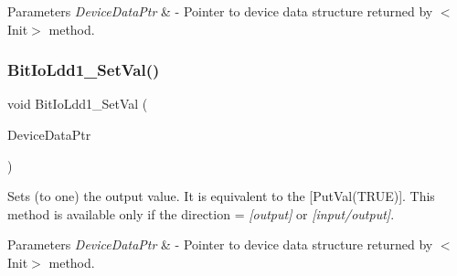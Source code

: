 \begin{DoxyParams}{Parameters}
{\em Device\+Data\+Ptr} & -\/ Pointer to device data structure returned by $<$\+Init$>$ method. \\
\hline
\end{DoxyParams}
\mbox{\label{group___bit_io_ldd1__module_ga64282ec63632688f21f6b06477f48214}} 
\subsubsection{\texorpdfstring{Bit\+Io\+Ldd1\+\_\+\+Set\+Val()}{BitIoLdd1\_SetVal()}}
{\footnotesize\ttfamily void Bit\+Io\+Ldd1\+\_\+\+Set\+Val (\begin{DoxyParamCaption}\item[{\hyperlink{group___p_e___types__module_gac5cf1362f1f0e3a2ce71b1bf2276d091}{L\+D\+D\+\_\+\+T\+Device\+Data} $\ast$}]{Device\+Data\+Ptr }\end{DoxyParamCaption})}



Sets (to one) the output value. It is equivalent to the \mbox{[}Put\+Val(\+T\+R\+U\+E)\mbox{]}. This method is available only if the direction = {\itshape \mbox{[}output\mbox{]}} or {\itshape \mbox{[}input/output\mbox{]}}. 


\begin{DoxyParams}{Parameters}
{\em Device\+Data\+Ptr} & -\/ Pointer to device data structure returned by $<$\+Init$>$ method. \\
\hline
\end{DoxyParams}
